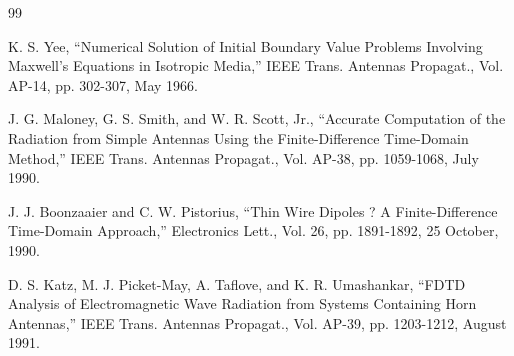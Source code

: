 \begin{thebibliography}{99}

  K. S. Yee, ``Numerical Solution of Initial Boundary Value Problems Involving Maxwell's Equations in Isotropic Media,'' IEEE Trans. Antennas Propagat., Vol. AP-14, pp. 302-307, May 1966.

 J. G. Maloney, G. S. Smith, and W. R. Scott, Jr., ``Accurate Computation of the Radiation from Simple Antennas Using the Finite-Difference Time-Domain Method,'' IEEE Trans. Antennas Propagat., Vol. AP-38, pp. 1059-1068, July 1990.

 J. J. Boonzaaier and C. W. Pistorius, ``Thin Wire Dipoles ? A Finite-Difference Time-Domain Approach,'' Electronics Lett., Vol. 26, pp. 1891-1892, 25 October, 1990.

 D. S. Katz, M. J. Picket-May, A. Taflove, and K. R. Umashankar, ``FDTD Analysis of Electromagnetic Wave Radiation from Systems Containing Horn Antennas,'' IEEE Trans. Antennas Propagat., Vol. AP-39, pp. 1203-1212, August 1991.

\end{thebibliography}


